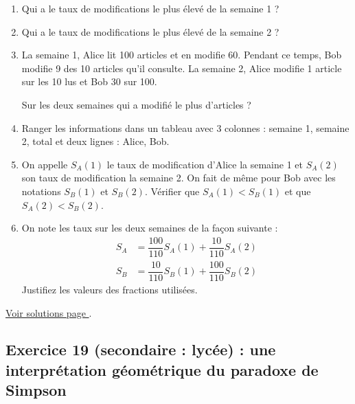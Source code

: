 \begin{enumerate}[label=C\arabic*)]
	\item Qui a le taux de modifications le plus élevé de la semaine 1 ?
	\item Qui a le taux de modifications le plus élevé de la semaine 2 ?
	\item La semaine 1, Alice lit 100 articles et en modifie 60. Pendant ce temps, Bob modifie 9 des 10 articles qu'il consulte. La semaine 2, Alice modifie 1 article sur les 10 lus et Bob 30 sur 100.  
	
	Sur les deux semaines qui a modifié le plus d'articles ?
	\item Ranger les informations dans un tableau avec 3 colonnes : semaine 1, semaine 2, total et deux lignes : Alice, Bob.
	\item On appelle $S_A(1)$ le taux de modification d'Alice la semaine 1 et $S_A(2)$ son taux de modification la semaine 2. On fait de même pour Bob avec les notations $S_B(1)$ et $S_B(2)$. Vérifier que $S_A(1) < S_B(1)$ et que $S_A(2) < S_B(2)$.
	\item On note les taux sur les deux semaines de la façon suivante :
		\begin{align*}
			S_A &= \dfrac{100}{110}S_A(1) + \dfrac{10}{110}S_A(2) \\
			S_B &= \dfrac{10}{110}S_B(1) + \dfrac{100}{110}S_B(2)
		\end{align*}
	 	Justifiez les valeurs des fractions utilisées.
\end{enumerate}

\hyperref[sol:niveau18]{Voir solutions page \pageref{sol:niveau18}}.

\newpage


\subsection{Exercice 19 (secondaire : lycée) : une interprétation géométrique du paradoxe de Simpson}

\label{geom:niveau19}

